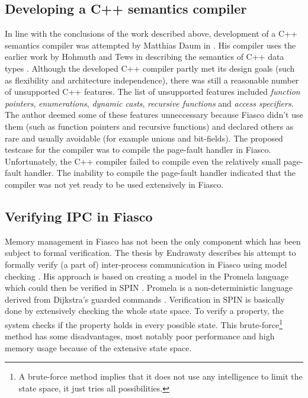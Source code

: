 \subsection{Developing a C++ semantics compiler}
In line with the conclusions of the work described above, development of a C++ semantics compiler was attempted by Matthias Daum in \cite{daum03development}. His compiler uses the earlier work by Hohmuth and Tews in describing the semantics of C++ data types \cite{hohmuth03semantics}. Although the developed C++ compiler partly met its design goals (such as flexibility and architecture independence), there was still a reasonable number of unsupported C++ features. The list of unsupported features included \emph{function pointers}, \emph{enumerations}, \emph{dynamic casts}, \emph{recursive functions} and \emph{access specifiers}. The author deemed some of these features unneccessary because Fiasco didn't use them (such as function pointers and recursive functions) and declared others as rare and usually avoidable (for example unions and bit-fields). The proposed testcase for the compiler was to compile the page-fault handler in Fiasco. Unfortunately, the C++ compiler failed to compile even the relatively small page-fault handler. The inability to compile the page-fault handler indicated that the compiler was not yet ready to be used extensively in Fiasco.

\subsection{Verifying IPC in Fiasco}
Memory management in Fiasco has not been the only component which has been subject to formal verification. The thesis by Endrawaty describes his attempt to formally verify (a part of) inter-process communication in Fiasco using model checking \cite{endrawaty05veri}. His approach is based on creating a model in the Promela language which could then be verified in SPIN \cite{havelund00spin}. Promela is a non-deterministic language derived from Dijkstra's guarded commands \cite{dijkstra75guarded}. Verification in SPIN is basically done by extensively checking the whole state space. To verify a property, the system checks if the property holds in every possible state. This brute-force\footnote{A brute-force method implies that it does not use any intelligence to limit the state space, it just tries all possibilities.} method has some disadvantages, most notably poor performance and high memory usage because of the extensive state space.\emptyline

